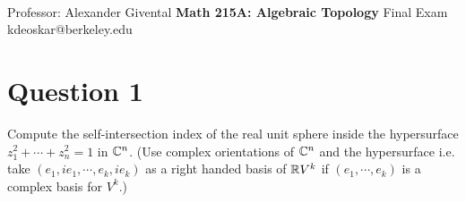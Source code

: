 \documentclass[11pt]{article}
\begin{document}
\thispagestyle{empty}
\bigskip \
\vspace{0.1cm}

\begin{center}
{\fontsize{22}{22} \selectfont Professor: Alexander Givental}
\vskip 16pt
{\fontsize{30}{30} \selectfont \bf \sffamily Math 215A: Algebraic Topology}
\vskip 24pt
{\fontsize{16}{16} \selectfont \rmfamily Final Exam} 
\vskip 6pt
{\fontsize{14}{14} \selectfont \ttfamily kdeoskar@berkeley.edu} 
\vskip 24pt
\end{center}


\tableofcontents
\newpage




\section{Question 1}
\begin{bluebox}
  Compute the self-intersection index of the real unit sphere inside the hypersurface $z_1^2 + \cdots + z_n^2 = 1$ in $\mathbb{C}^n$. (Use complex orientations of $\mathbb{C}^n$ and the hypersurface i.e. take $(e_1, ie_1, \cdots, e_k, ie_k)$ as a right handed basis of $\mathbb{R} V^k$ if $(e_1, \cdots, e_k)$ is a complex basis for $V^k$.)
\end{bluebox}
\end{document}
